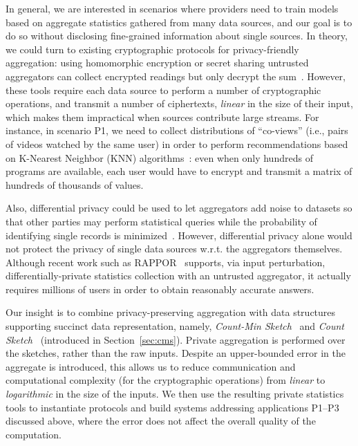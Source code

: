 \documentclass[conference]{IEEEtran}
\begin{document}
In general, we are interested in scenarios where providers need to train models based on aggregate statistics gathered from many data sources, and our goal is to do so without disclosing fine-grained information about single sources. 
In theory, we could turn to existing cryptographic protocols for privacy-friendly aggregation: using homomorphic encryption or secret sharing untrusted aggregators can collect encrypted readings but only decrypt the sum~\cite{chan2012privacy,Mobiquitous05,Kursawe:2011,
erkin2012private,shi2011privacy,bilogrevic2014s}. However, these tools require each data source to perform a number of cryptographic operations, and transmit a number of ciphertexts, {\em linear} in the size of their input, which makes them impractical when sources contribute large streams. 
For instance, in scenario P1, 
we need to collect distributions of ``co-views'' (i.e., pairs of videos watched by the same user) in order to perform recommendations based on K-Nearest Neighbor (KNN) algorithms~\cite{cover1967nearest}: even when only hundreds of programs are available, each user would have to encrypt and transmit a matrix of hundreds of thousands of values. 


Also, differential privacy could be used to let aggregators add noise to datasets so that other parties may perform statistical queries while the probability of identifying single records is minimized~\cite{cormode2012differentially}. However, differential privacy alone would not protect the privacy of single data sources w.r.t. the aggregators themselves. Although recent work such as RAPPOR~\cite{erlingsson2014rappor} supports, via input perturbation, differentially-private statistics collection with an untrusted aggregator, it actually requires millions of users in order to obtain reasonably accurate answers. 


Our insight is to combine privacy-preserving aggregation with data structures supporting succinct data representation, namely,  {\em Count-Min Sketch}~\cite{cormode2005improved} and  {\em Count Sketch}~\cite{charikar2002finding} (introduced in Section~\ref{sec:cms}). Private aggregation is performed over the sketches, rather than the raw inputs. Despite an upper-bounded error in the aggregate is introduced, this allows us to reduce communication and computational complexity (for the cryptographic operations) from {\em linear} to {\em logarithmic} in the size of the inputs. We then use the resulting private statistics tools to instantiate protocols and build systems addressing applications P1--P3 discussed above, where the error does not affect the overall quality of the computation.
\end{document}

